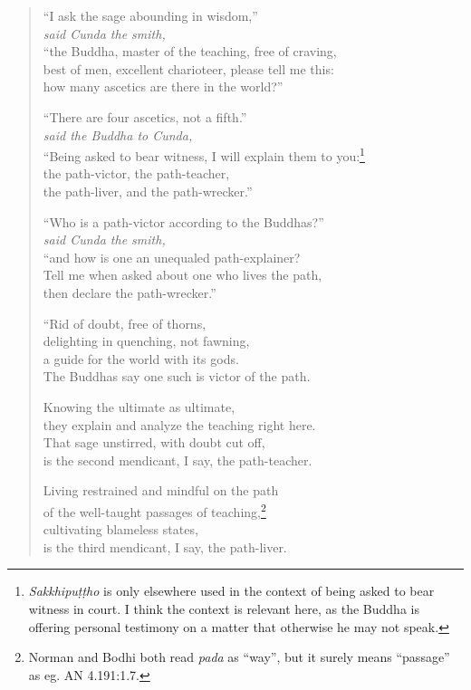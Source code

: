 \documentclass[12pt,openany]{book}%
\newcommand*{\scspeaker}[1]{\hspace{2em}\textit{#1}}
\begin{document}
\begin{verse}%
“I ask the sage abounding in wisdom,” \\
\scspeaker{said Cunda the smith, }\\
“the Buddha, master of the teaching, free of craving, \\
best of men, excellent charioteer, please tell me this: \\
how many ascetics are there in the world?” 

“There are four ascetics, not a fifth.” \\
\scspeaker{said the Buddha to Cunda, }\\
“Being asked to bear witness, I will explain them to you:\footnote{\textit{\textsanskrit{Sakkhipuṭṭho}} is only elsewhere used in the context of being asked to bear witness in court. I think the context is relevant here, as the Buddha is offering personal testimony on a matter that otherwise he may not speak. } \\
the path-victor, the path-teacher, \\
the path-liver, and the path-wrecker.” 

“Who is a path-victor according to the Buddhas?” \\
\scspeaker{said Cunda the smith, }\\
“and how is one an unequaled path-explainer? \\
Tell me when asked about one who lives the path, \\
then declare the path-wrecker.” 

“Rid of doubt, free of thorns, \\
delighting in quenching, not fawning, \\
a guide for the world with its gods. \\
The Buddhas say one such is victor of the path. 

Knowing the ultimate as ultimate, \\
they explain and analyze the teaching right here. \\
That sage unstirred, with doubt cut off, \\
is the second mendicant, I say, the path-teacher. 

Living restrained and mindful on the path \\
of the well-taught passages of teaching,\footnote{Norman and Bodhi both read \textit{pada} as “way”, but it surely means “passage” as eg. AN 4.191:1.7. } \\
cultivating blameless states, \\
is the third mendicant, I say, the path-liver. 


\end{verse}
\end{document}
